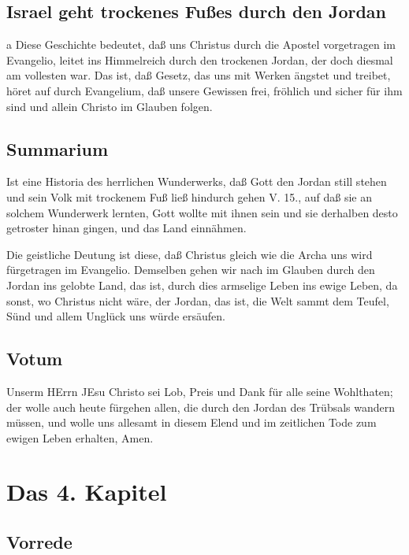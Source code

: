 \section{Israel geht trockenes Fußes durch den Jordan}

a Diese Geschichte bedeutet, daß uns Christus durch die Apostel vorgetragen im Evangelio, leitet ins Himmelreich durch den trockenen Jordan, der doch diesmal am vollesten war. Das ist, daß Gesetz, das uns mit Werken ängstet und treibet, höret auf durch Evangelium, daß unsere Gewissen frei, fröhlich und sicher für ihm sind und allein Christo im Glauben folgen.
\section{Summarium}

Ist eine Historia des herrlichen Wunderwerks, daß Gott den Jordan still stehen und sein Volk mit trockenem Fuß ließ hindurch gehen V. 15., auf daß sie an solchem Wunderwerk lernten, Gott wollte mit ihnen sein und sie derhalben desto getroster hinan gingen, und das Land einnähmen.

Die geistliche Deutung ist diese, daß Christus gleich wie die Archa uns wird fürgetragen im Evangelio. Demselben gehen wir nach im Glauben durch den Jordan ins gelobte Land, das ist, durch dies armselige Leben ins ewige Leben, da sonst, wo Christus nicht wäre, der Jordan, das ist, die Welt sammt dem Teufel, Sünd und allem Unglück uns würde ersäufen.

\section{Votum}

Unserm HErrn JEsu Christo sei Lob, Preis und Dank für alle seine Wohlthaten; der wolle auch heute fürgehen allen, die durch den Jordan des Trübsals wandern müssen, und wolle uns allesamt in diesem Elend und im zeitlichen Tode zum ewigen Leben erhalten, Amen.

\chapter{Das 4. Kapitel}

\section{Vorrede}


